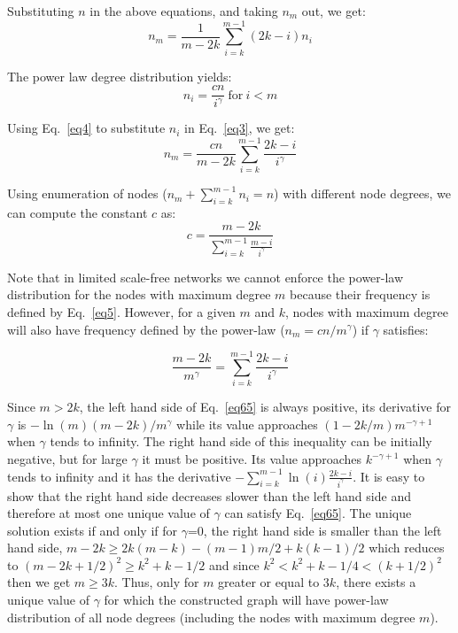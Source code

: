 \documentclass[10pt,journal,cspaper,compsoc]{IEEEtran}
\begin{document}
Substituting $n$ in the above equations, and taking $n_m$ out, we get:
\begin{equation}
\label{eq3}
n_m = \frac{1}{m-2k}\sum_{i=k}^{m-1} (2k-i) n_i
\end{equation}

The power law degree distribution yields:
\begin{equation}
\label{eq4}
n_i  = \frac{cn}{i^{\gamma}}~\mbox{for}~i<m
\end{equation}

Using Eq.~\ref{eq4} to substitute $n_i$ in Eq.~\ref{eq3}, we get:
\begin{equation}
\label{eq5}
n_m  = \frac{cn}{m-2k}\sum_{i=k}^{m-1}\frac{2k-i}{i^{\gamma}}
\end{equation}

Using enumeration of nodes ($n_m + \sum_{i=k}^{m-1}n_i = n$) with different node degrees, we can compute the constant $c$ as:
\begin{equation}
\label{eq6}
c = \frac{m-2k}{\sum_{i=k}^{m-1}\frac{m-i}{i^{\gamma}}}
\end{equation}

Note that in limited scale-free networks we cannot enforce the power-law distribution for the nodes with maximum degree $m$ because their frequency is defined by Eq.~\ref{eq5}. However, for a given $m$ and $k$, nodes with maximum degree will also have frequency defined by the power-law ($n_m=cn/m^{\gamma}$) if $\gamma$ satisfies:

\begin{equation}
\label{eq65}
\frac{m-2k}{m^{\gamma}}=\sum_{i=k}^{m-1}\frac{2k-i}{i^{\gamma}}
\end{equation}

Since $m>2k$, the left hand side of Eq.~\ref{eq65} is always positive, its derivative for $\gamma$ is $-\ln(m)(m-2k)/m^\gamma$ while its value approaches $(1-2k/m)m^{-\gamma+1}$ when $\gamma$ tends to infinity. The right hand side of this inequality can be initially negative, but for large $\gamma$ it must be positive. Its value approaches $k^{-\gamma+1}$ when $\gamma$ tends to infinity and it has the derivative $-\sum_{i=k}^{m-1}\ln(i)\frac{2k-i}{i^\gamma}$.
It is easy to show that the right hand side decreases slower than the left hand side and therefore at most one unique value of $\gamma$ can satisfy Eq.~\ref{eq65}. The unique solution exists if and only if for $\gamma$=0, the right hand side is smaller than the left hand side, $m-2k \geq 2k(m-k)-(m-1)m/2+k(k-1)/2$
which reduces to $(m-2k+1/2)^2 \geq k^2+k-1/2$ and since $k^2<k^2+k-1/4<(k+1/2)^2$ then we get $m\geq 3k$. Thus, only for $m$ greater or equal to $3k$, there exists a unique value of $\gamma$ for which the constructed graph will have power-law distribution of all node degrees (including the nodes with maximum degree $m$).
\end{document}
